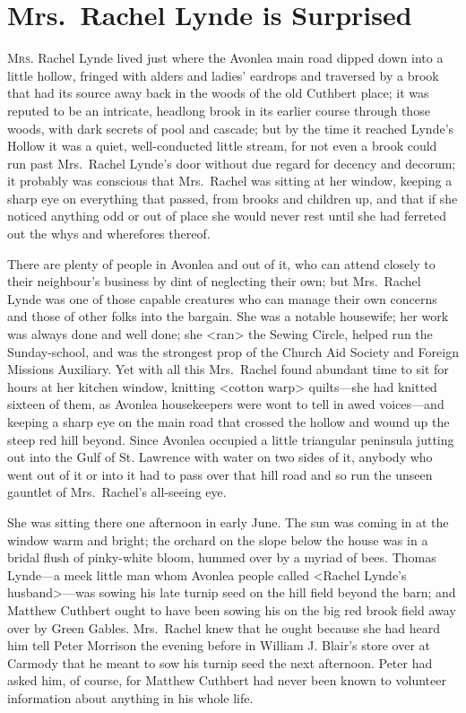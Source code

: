 \chapter{Mrs.~Rachel Lynde is Surprised}

\lettrine{M}{rs.} Rachel Lynde lived just where the Avonlea main road dipped down into a little hollow, fringed with alders and ladies' eardrops and traversed by a brook that had its source away back in the woods of the old Cuthbert place; it was reputed to be an intricate, headlong brook in its earlier course through those woods, with dark secrets of pool and cascade; but by the time it reached Lynde's Hollow it was a quiet, well-conducted little stream, for not even a brook could run past Mrs.~Rachel Lynde's door without due regard for decency and decorum; it probably was conscious that Mrs.~Rachel was sitting at her window, keeping a sharp eye on everything that passed, from brooks and children up, and that if she noticed anything odd or out of place she would never rest until she had ferreted out the whys and wherefores thereof.

There are plenty of people in Avonlea and out of it, who can attend closely to their neighbour's business by dint of neglecting their own; but Mrs.~Rachel Lynde was one of those capable creatures who can manage their own concerns and those of other folks into the bargain. She was a notable housewife; her work was always done and well done; she <ran> the Sewing Circle, helped run the Sunday-school, and was the strongest prop of the Church Aid Society and Foreign Missions Auxiliary. Yet with all this Mrs.~Rachel found abundant time to sit for hours at her kitchen window, knitting <cotton warp> quilts—she had knitted sixteen of them, as Avonlea housekeepers were wont to tell in awed voices—and keeping a sharp eye on the main road that crossed the hollow and wound up the steep red hill beyond. Since Avonlea occupied a little triangular peninsula jutting out into the Gulf of St. Lawrence with water on two sides of it, anybody who went out of it or into it had to pass over that hill road and so run the unseen gauntlet of Mrs.~Rachel's all-seeing eye.

She was sitting there one afternoon in early June. The sun was coming in at the window warm and bright; the orchard on the slope below the house was in a bridal flush of pinky-white bloom, hummed over by a myriad of bees. Thomas Lynde—a meek little man whom Avonlea people called <Rachel Lynde's husband>—was sowing his late turnip seed on the hill field beyond the barn; and Matthew Cuthbert ought to have been sowing his on the big red brook field away over by Green Gables. Mrs.~Rachel knew that he ought because she had heard him tell Peter Morrison the evening before in William J. Blair's store over at Carmody that he meant to sow his turnip seed the next afternoon. Peter had asked him, of course, for Matthew Cuthbert had never been known to volunteer information about anything in his whole life.

